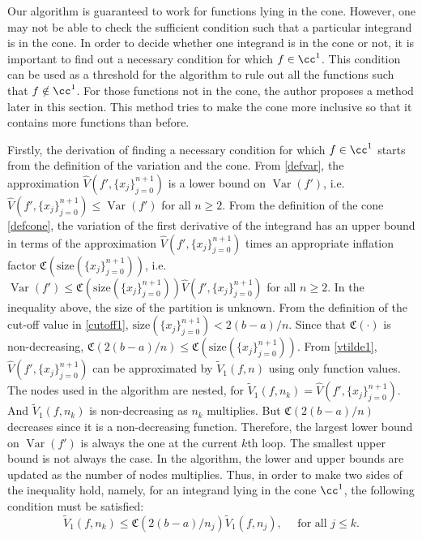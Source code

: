 \documentclass{iitthesis}
\DeclareMathOperator{\Var}{Var}
\theoremstyle{definition}
\theoremstyle{remark}
\begin{document}

Our algorithm is guaranteed to work for functions lying in the cone. However, one may not be able to check the sufficient condition such that a particular integrand is in the cone. In order to decide whether one integrand is in the cone or not, it is important to find out a necessary condition for which $f\in\cc^1$. This condition can be used as a threshold for the algorithm to rule out all the functions such that $f\notin\cc^1$. For those functions not in the cone, the author proposes a method later in this section. This method tries to make the cone more inclusive so that it contains more functions than before.

Firstly, the derivation of finding a necessary condition for which $f\in\cc^1$ starts from the definition of the variation and the cone. From \eqref{defvar}, the approximation $\widehat{V}({f'},\{x_j\}_{j=0}^{n+1})$ is a lower bound on $\Var({f'})$, i.e. $\widehat{V}({f'},\{x_j\}_{j=0}^{n+1})\leq \Var({f'})$ for all $n \ge 2$. From the definition of the cone \eqref{defcone}, the variation of the first derivative of the integrand has an upper bound in terms of the approximation $\widehat{V}({f'},\{x_j\}_{j=0}^{n+1})$ times an appropriate inflation factor $\mathfrak{C}(\text{size}(\{x_j\}_{j=0}^{n+1}))$, i.e. $\Var({f'})\leq \mathfrak{C}(\text{size}(\{x_j\}_{j=0}^{n+1}))\widehat{V}({f'},\{x_j\}_{j=0}^{n+1})$ for all $n \ge 2$.
In the inequality above, the size of the partition is unknown. From the definition of the cut-off value in \eqref{cutoff1}, $\text{size}(\{x_j\}_{j=0}^{n+1})<2(b-a)/n$. Since that $\mathfrak{C}(\cdot)$ is non-decreasing, $\mathfrak{C}(2(b-a)/n)\leq \mathfrak{C}(\text{size}(\{x_j\}_{j=0}^{n+1}))$. From \eqref{vtilde1}, $\widehat{V}({f'},\{x_j\}_{j=0}^{n+1})$ can be approximated by $\widetilde{V}_1(f,n)$ using only function values. The nodes used in the algorithm are nested, for $\widetilde{V}_1(f,n_k)=\widehat{V}({f'},\{x_j\}_{j=0}^{n+1})$. And $\widetilde{V}_1(f,n_k)$ is non-decreasing as $n_k$ multiplies. But $\mathfrak{C}(2(b-a)/n)$ decreases since it is a non-decreasing function. Therefore, the largest lower bound on $\Var(f')$ is always the one at the current $k$th loop. The smallest upper bound is not always the case. In the algorithm, the lower and upper bounds are updated as the number of nodes multiplies.
Thus, in order to make two sides of the inequality hold, namely, for an integrand lying in the cone $\cc^1$, the following condition must be satisfied:
\begin{equation}\label{neccontrap}
    \widetilde{V}_1(f,n_k)\leq\mathfrak{C}(2(b-a)/n_{j})\widetilde{V}_1(f,n_j), \quad \text{ for all } j \leq k.
\end{equation}
\end{document}
